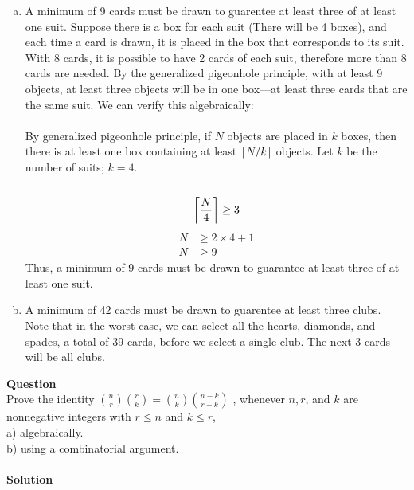 \documentclass[article,12pt]{article}
\newcounter{question}
\def\questionnum{{\Large\bfseries{Question \arabic{question} }}\\[1em]}
\newcommand{\question}{
    \stepcounter{question}
    \questionnum
}
\newcommand{\solution}{
    {{\large\bfseries{Solution}}}
}
\DeclarePairedDelimiter\ceil{\lceil}{\rceil} %
\begin{document}
\begin{enumerate}[a)]
    \item 
    A minimum of 9 cards must be drawn to guarentee at least three of at least one suit. Suppose there is a box for each suit (There will be 4 boxes), and each time a card is drawn, it is placed in the box that corresponds to its suit. With 8 cards, it is possible to have 2 cards of each suit, therefore more than 8 cards are needed. By the generalized pigeonhole principle, with at least 9 objects, at least three objects will be in one box---at least three cards that are the same suit. We can verify this algebraically: \\
    \\
    By generalized pigeonhole principle, if $N$ objects are placed in $k$ boxes, then there is at least one box containing at least $\ceil*{N/k}$ objects. Let $k$ be the number of suits; $k=4$. \\
    \\
    \[ \ceil*{\frac{N}{4}} \geq 3 \]
    \begin{align*}
        N &\geq 2 \times 4 + 1 \\
        N &\geq 9
    \end{align*}
    Thus, a minimum of 9 cards must be drawn to guarantee at least three of at least one suit.
    \item 
    A minimum of 42 cards must be drawn to guarentee at least three clubs. Note that in the worst case, we can select all the hearts, diamonds, and spades, a total of 39 cards, before we select a single club. The next 3 cards will be all clubs.  
\end{enumerate}
\newpage
\question
Prove the identity $\binom{n}{r}\binom{r}{k}=\binom{n}{k}\binom{n-k}{r-k}$ , whenever $n, r$, and $k$ are nonnegative integers with $r \leq n$ and $k \leq r$,\\a) algebraically.\\ b) using a combinatorial argument. \\
\\
\solution 
\end{document}
